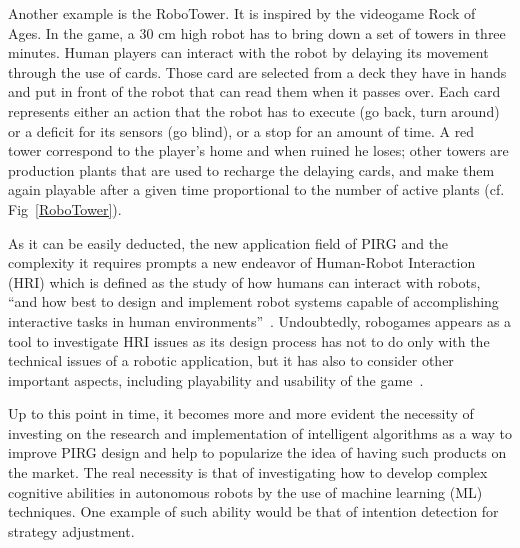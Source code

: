 
Another example is the RoboTower. It is inspired by the videogame Rock of Ages. In the game, a 30 cm high robot has to bring down a set of towers in three minutes. Human players can interact with the robot by delaying its movement through the use of cards. Those card are selected from a deck they have in hands and put in front of the robot that can read them when it passes over. Each card represents either an action that the robot has to execute (go back, turn around) or a deficit for its sensors (go blind), or a stop for an amount of time. A red tower correspond to the player's home and when ruined he loses; other towers are production plants that are used to recharge the delaying cards, and make them again playable after a given time proportional to the number of active plants (cf. Fig~\ref{RoboTower}).


As it can be easily deducted, the new application field of PIRG and the complexity it requires prompts a new endeavor of Human-Robot Interaction (HRI) which is defined as the study of how humans can interact with robots, ``and how best to design and implement robot systems capable of accomplishing interactive tasks in human environments''~\cite{feil-seifer_human_2009}. Undoubtedly, robogames appears as a tool to investigate HRI issues as its design process has not to do only with the technical issues of a robotic application, but it has also to consider other important aspects, including playability and usability of the game~\cite{martinoia_physically_2013}.

Up to this point in time, it becomes more and more evident the necessity of investing on the research and implementation of intelligent algorithms as a way to improve PIRG design and help to popularize the idea of having such products on the market. The real necessity is that of investigating how to develop complex cognitive abilities in autonomous robots by the use of machine learning (ML) techniques. One example of such ability would be that of intention detection for strategy adjustment. 

